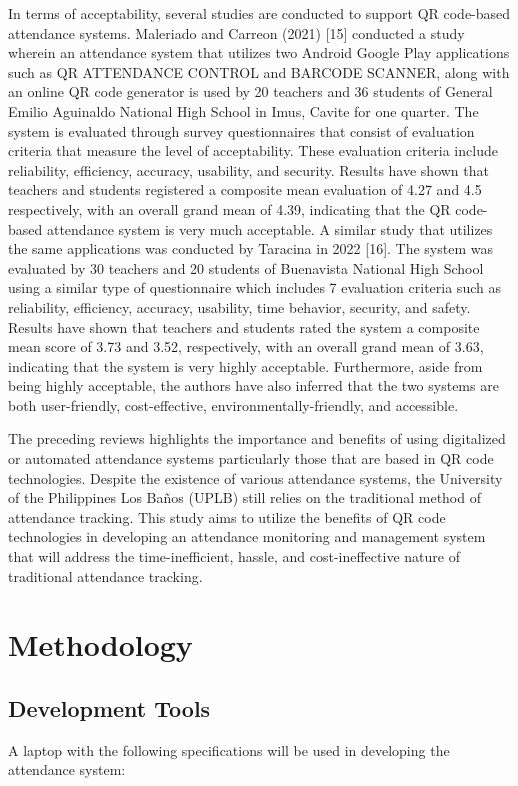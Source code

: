 \documentclass[journal]{./IEEE/IEEEtran}
\begin{document}
In terms of acceptability, several studies are conducted to support QR code-based attendance systems. Maleriado and Carreon (2021) [15] conducted a study wherein an attendance system that utilizes two Android Google Play applications such as QR ATTENDANCE CONTROL and BARCODE SCANNER, along with an online QR code generator is used by 20 teachers and 36 students of General Emilio Aguinaldo National High School in Imus, Cavite for one quarter. The system is evaluated through survey questionnaires that consist of evaluation criteria that measure the level of acceptability. These evaluation criteria include reliability, efficiency, accuracy, usability, and security. Results have shown that teachers and students registered a composite mean evaluation of 4.27 and 4.5 respectively, with an overall grand mean of 4.39, indicating that the QR code-based attendance system is very much acceptable. A similar study that utilizes the same applications was conducted by Taracina in 2022 [16]. The system was evaluated by 30 teachers and 20 students of Buenavista National High School using a similar type of questionnaire which includes 7 evaluation criteria such as reliability, efficiency, accuracy, usability, time behavior, security, and safety. Results have shown that teachers and students rated the system a composite mean score of 3.73 and 3.52, respectively, with an overall grand mean of 3.63, indicating that the system is very highly acceptable. Furthermore, aside from being highly acceptable, the authors have also inferred that the two systems are both user-friendly, cost-effective, environmentally-friendly, and accessible. 

The preceding reviews highlights the importance and benefits of using digitalized or automated attendance systems particularly those that are based in QR code technologies. Despite the existence of various attendance systems, the University of the Philippines Los Baños (UPLB) still relies on the traditional method of attendance tracking. This study aims to utilize the benefits of QR code technologies in developing an attendance monitoring and management system that will address the time-inefficient, hassle, and cost-ineffective nature of traditional attendance tracking.


\section{Methodology}

\subsection{Development Tools}
A laptop with the following specifications will be used in developing the attendance system:
\end{document}
